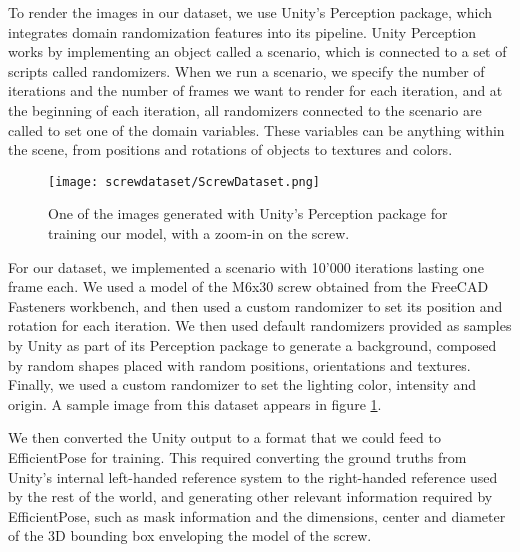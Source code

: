 To render the images in our dataset, we use Unity's Perception package\cite{unityPerception}, which integrates domain randomization features into its pipeline. Unity Perception works by implementing an object called a scenario, which is connected to a set of scripts called randomizers. When we run a scenario, we specify the number of iterations and the number of frames we want to render for each iteration, and at the beginning of each iteration, all randomizers connected to the scenario are called to set one of the domain variables. These variables can be anything within the scene, from positions and rotations of objects to textures and colors.

\begin{figure}
    \centering
    \texttt{[image: screwdataset/ScrewDataset.png]}
    \caption{One of the images generated with Unity's Perception package for training our model, with a zoom-in on the screw.}
    \label{fig:screwdataset}
\end{figure}

For our dataset, we implemented a scenario with 10'000 iterations lasting one frame each. We used a model of the M6x30 screw obtained from the FreeCAD Fasteners workbench\cite{Fasteners}, and then used a custom randomizer to set its position and rotation for each iteration. We then used default randomizers provided as samples by Unity as part of its Perception package to generate a background, composed by random shapes placed with random positions, orientations and textures. Finally, we used a custom randomizer to set the lighting color, intensity and origin. A sample image from this dataset appears in figure \ref{fig:screwdataset}.

We then converted the Unity output to a format that we could feed to EfficientPose for training. This required converting the ground truths from Unity's internal left-handed reference system to the right-handed reference used by the rest of the world, and generating other relevant information required by EfficientPose, such as mask information and the dimensions, center and diameter of the 3D bounding box enveloping the model of the screw.